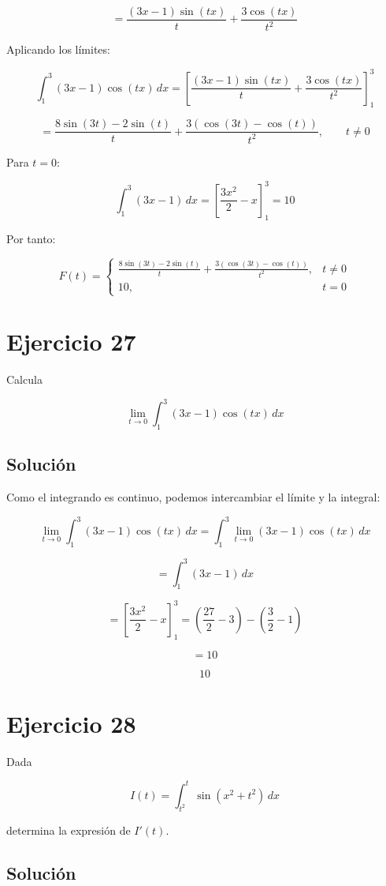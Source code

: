 \documentclass[fleqn]{article}
\begin{document}
	\[
	=
	\frac{(3x-1)\sin(tx)}{t}
	+
	\frac{3\cos(tx)}{t^2}
	\]

	Aplicando los límites:

	\[
	\int_1^3(3x-1)\cos(tx)\,dx
	=
	\left[
	\frac{(3x-1)\sin(tx)}{t}
	+
	\frac{3\cos(tx)}{t^2}
	\right]_1^3
	\]

	\[
	=
	\frac{8\sin(3t)-2\sin(t)}{t}
	+
	\frac{3\left(\cos(3t)-\cos(t)\right)}{t^2},
	\qquad t\neq0
	\]

	Para $t=0$:

	\[
	\int_1^3(3x-1)\,dx
	=
	\left[
	\frac{3x^2}{2}-x
	\right]_1^3
	=
	10
	\]

	Por tanto:

	\[
	\boxed{
	F(t)=
	\begin{cases}
	\displaystyle
	\frac{8\sin(3t)-2\sin(t)}{t}
	+
	\frac{3\left(\cos(3t)-\cos(t)\right)}{t^2},
	& t\neq0 \\[4mm]
	10,
	& t=0
	\end{cases}
	}
	\]

\section{Ejercicio 27}
	Calcula

	\[
	\lim_{t\to0}
	\int_1^3(3x-1)\cos(tx)\,dx
	\]

	\subsection{Solución}

	Como el integrando es continuo, podemos intercambiar el límite y la integral:

	\[
	\lim_{t\to0}
	\int_1^3(3x-1)\cos(tx)\,dx
	=
	\int_1^3
	\lim_{t\to0}
	(3x-1)\cos(tx)\,dx
	\]

	\[
	=
	\int_1^3(3x-1)\,dx
	\]

	\[
	=
	\left[
	\frac{3x^2}{2}-x
	\right]_1^3
	=
	\left(\frac{27}{2}-3\right)
	-
	\left(\frac{3}{2}-1\right)
	\]

	\[
	=
	10
	\]

	\[
	\boxed{10}
	\]

\section{Ejercicio 28}
	Dada

	\[
	I(t)=\int_{t^2}^{t}\sin(x^2+t^2)\,dx
	\]

	determina la expresión de $I'(t)$.

	\subsection{Solución}
\end{document}
